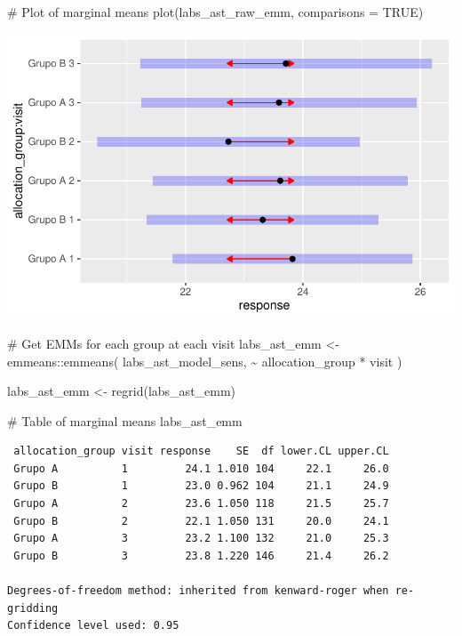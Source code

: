 \documentclass[
  letterpaper,
  DIV=11,
  numbers=noendperiod]{scrartcl}
\newenvironment{Shaded}{\begin{snugshade}}{\end{snugshade}}
\newcommand{\AttributeTok}[1]{\textcolor[rgb]{0.40,0.45,0.13}{#1}}
\newcommand{\CommentTok}[1]{\textcolor[rgb]{0.37,0.37,0.37}{#1}}
\newcommand{\ConstantTok}[1]{\textcolor[rgb]{0.56,0.35,0.01}{#1}}
\newcommand{\FunctionTok}[1]{\textcolor[rgb]{0.28,0.35,0.67}{#1}}
\newcommand{\NormalTok}[1]{\textcolor[rgb]{0.00,0.23,0.31}{#1}}
\newcommand{\OtherTok}[1]{\textcolor[rgb]{0.00,0.23,0.31}{#1}}
\newcommand{\SpecialCharTok}[1]{\textcolor[rgb]{0.37,0.37,0.37}{#1}}
\begin{document}
\begin{Shaded}
\begin{Highlighting}[]
\CommentTok{\# Plot of marginal means}
\FunctionTok{plot}\NormalTok{(labs\_ast\_raw\_emm, }\AttributeTok{comparisons =} \ConstantTok{TRUE}\NormalTok{)}
\end{Highlighting}
\end{Shaded}

\includegraphics{Outcomes_V1V2V3_files/figure-pdf/labs_ast_raw_emm-1.pdf}

\begin{Shaded}
\begin{Highlighting}[]
\CommentTok{\# Get EMMs for each group at each visit}
\NormalTok{labs\_ast\_emm }\OtherTok{\textless{}{-}}\NormalTok{ emmeans}\SpecialCharTok{::}\FunctionTok{emmeans}\NormalTok{(}
\NormalTok{    labs\_ast\_model\_sens, }
    \SpecialCharTok{\textasciitilde{}}\NormalTok{ allocation\_group }\SpecialCharTok{*}\NormalTok{ visit}
\NormalTok{)}

\NormalTok{labs\_ast\_emm }\OtherTok{\textless{}{-}} \FunctionTok{regrid}\NormalTok{(labs\_ast\_emm)}

\CommentTok{\# Table of marginal means}
\NormalTok{labs\_ast\_emm}
\end{Highlighting}
\end{Shaded}

\begin{verbatim}
 allocation_group visit response    SE  df lower.CL upper.CL
 Grupo A          1         24.1 1.010 104     22.1     26.0
 Grupo B          1         23.0 0.962 104     21.1     24.9
 Grupo A          2         23.6 1.050 118     21.5     25.7
 Grupo B          2         22.1 1.050 131     20.0     24.1
 Grupo A          3         23.2 1.100 132     21.0     25.3
 Grupo B          3         23.8 1.220 146     21.4     26.2

Degrees-of-freedom method: inherited from kenward-roger when re-gridding 
Confidence level used: 0.95 
\end{verbatim}
\end{document}
